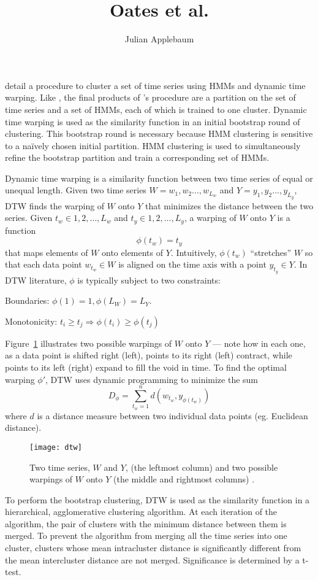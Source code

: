 \documentclass[12pt]{article}
\title{Oates et al.}
\author{Julian Applebaum}
\begin{document}
\citet{oates} detail a procedure to cluster a set of time series using HMMs and dynamic time warping. Like \citet{smyth}, the final products of \citeauthor{oates}'s procedure are a partition on the set of time series and a set of HMMs, each of which is trained to one cluster. Dynamic time warping is used as the similarity function in an initial bootstrap round of clustering. This bootstrap round is necessary because HMM clustering is sensitive to a na\"{i}vely chosen initial partition. HMM clustering is used to simultaneously refine the bootstrap partition and train a corresponding set of HMMs.

Dynamic time warping \citep{oates} is a similarity function between two time
series of equal or unequal length. Given two time series $W = w_1, w_2 \dots, w_{L_w}$ and $Y = y_1, y_2 \dots, y_{L_y}$, DTW finds the warping of $W$ onto $Y$ that minimizes the distance between the two series. Given $t_w \in {1, 2, \dots, L_w}$ and $t_y \in {1, 2, \dots, L_y}$, a warping of $W$ onto $Y$ is a function
\[\phi(t_w) = t_y \]
 that maps elements of $W$ onto elements of $Y$. Intuitively, $\phi(t_w)$ ``stretches'' $W$ so that each data point $w_{t_w} \in W$ is aligned on the time axis with a point $y_{t_y} \in Y$. In DTW literature, $\phi$ is typically subject to two constraints:
\begin{description*}
	\item[Boundaries:] $\phi(1) = 1, \phi(L_W) = L_Y$.
	\item[Monotonicity:] $t_i \geq t_j \Rightarrow \phi(t_i) \geq \phi(t_j)$
\end{description*}
 Figure~\ref{dtwgraphic} illustrates two possible warpings of $W$ onto $Y$ --- note how in each one, as a data point is shifted right (left), points to its right (left) contract, while points to its left (right) expand to fill the void in time. To find the optimal warping $\phi'$, DTW uses dynamic programming to minimize the sum
 \[D_\phi = \displaystyle\sum\limits_{t_w = 1}^n d(w_{t_w}, y_{\phi(t_w)})\]
where $d$ is a distance measure between two individual data points (eg. Euclidean distance).

\begin{figure}[t]
	\centering
	\texttt{[image: dtw]}
	\caption{Two time series, $W$ and $Y$, (the leftmost column) and two possible warpings of
	$W$ onto $Y$ (the middle and rightmost columns) \citep{oates}.}
	\label{dtwgraphic}
\end{figure}

To perform the bootstrap clustering, DTW is used as the similarity function in a hierarchical, agglomerative clustering algorithm. At each iteration of the algorithm, the pair of clusters with the minimum distance between them is merged. To prevent the algorithm from merging all the time series into one cluster, clusters whose mean intracluster distance is significantly different from the mean intercluster distance are not merged. Significance is determined by a t-test.
\end{document}
